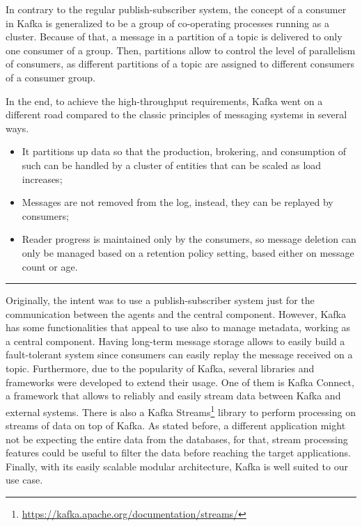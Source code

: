In contrary to the regular publish-subscriber system, the concept of a consumer in Kafka is generalized to be a group of co-operating processes running as a cluster.
Because of that, a message in a partition of a topic is delivered to only one consumer of a group.
Then, partitions allow to control the level of parallelism of consumers, as different partitions of a topic are assigned to different consumers of a consumer group.

In the end, to achieve the high-throughput requirements, Kafka went on a different road compared to the classic principles of messaging systems in several ways.

\begin{itemize}
    \item It partitions up data so that the production, brokering, and consumption of such can be handled by a cluster of entities that can be scaled as load increases;
    \item Messages are not removed from the log, instead, they can be replayed by consumers;
    \item Reader progress is maintained only by the consumers, so message deletion can only be managed based on a retention policy setting, based either on message count or age.
\end{itemize}

\par\noindent\hfil\rule{.6\textwidth}{0.4pt}\hfil

Originally, the intent was to use a publish-subscriber system just for the communication between the agents and the central component.
However, Kafka has some functionalities that appeal to use also to manage metadata, working as a central component.
Having long-term message storage allows to easily build a fault-tolerant system since consumers can easily replay the message received on a topic.
Furthermore, due to the popularity of Kafka, several libraries and frameworks were developed to extend their usage.
One of them is Kafka Connect, a framework that allows to reliably and easily stream data between Kafka and external systems.
There is also a Kafka Streams\footnote{\url{https://kafka.apache.org/documentation/streams/}} library to perform processing on streams of data on top of Kafka.
As stated before, a different application might not be expecting the entire data from the databases, for that, stream processing features could be useful to filter the data before reaching the target applications.
Finally, with its easily scalable modular architecture, Kafka is well suited to our use case.

